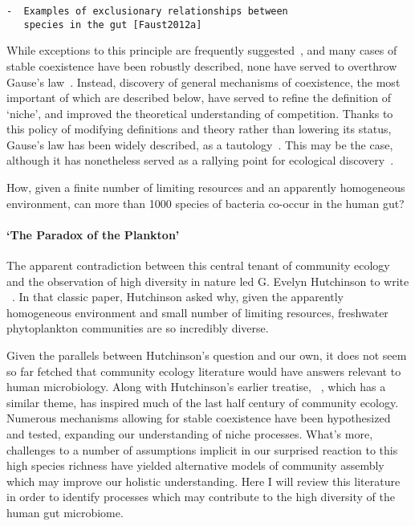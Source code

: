 \documentclass[12pt]{article}
\begin{document}
\begin{verbatim}
-  Examples of exclusionary relationships between
   species in the gut [Faust2012a]
\end{verbatim}

While exceptions to this principle are frequently suggested~\citep{Koch1974a,Koch1974b},
and many cases of stable coexistence have been robustly described,
none have served to overthrow Gause's law~\citep{Hutchinson1957}.
Instead, discovery of general mechanisms of coexistence, the
most important of which are described below, have served
to refine the definition of `niche', and improved the theoretical
understanding of competition.
Thanks to this policy of modifying definitions and theory
rather than lowering its status, Gause's law has been widely described,
as a tautology~\citep{Hutchinson1961,Slobodkin1961}.
This may be the case, although it has nonetheless served as a
rallying point for ecological discovery~\citep{Armstrong1980}.

How, given a finite number of limiting resources and an apparently
homogeneous environment, can more than 1000 species of bacteria
co-occur in the human gut?

\paragraph{`The Paradox of the Plankton'}
The apparent contradiction between this central tenant
of community ecology
and the observation of high diversity in nature led
G. Evelyn Hutchinson to write
~\citeyearpar{Hutchinson1961}.
In that classic paper, Hutchinson asked why,
given the apparently homogeneous environment
and small number of limiting resources,
freshwater phytoplankton communities are so incredibly diverse.

Given the parallels between Hutchinson's question and our own,
it does not seem so far fetched that community ecology literature would have
answers relevant to human microbiology.
Along with Hutchinson's earlier treatise,
~\citeyearpar{Hutchinson1959},
which has a similar theme,
 has inspired much of the
last half century of community ecology.
Numerous mechanisms allowing for stable coexistence have been
hypothesized and tested, expanding our understanding of niche
processes.
What's more, challenges to a number of assumptions implicit in our
surprised reaction to this high species richness
have yielded alternative models of community assembly
which may improve our holistic understanding.
Here I will review this literature in order to identify processes which may
contribute to the high diversity of the human gut microbiome.
\end{document}
